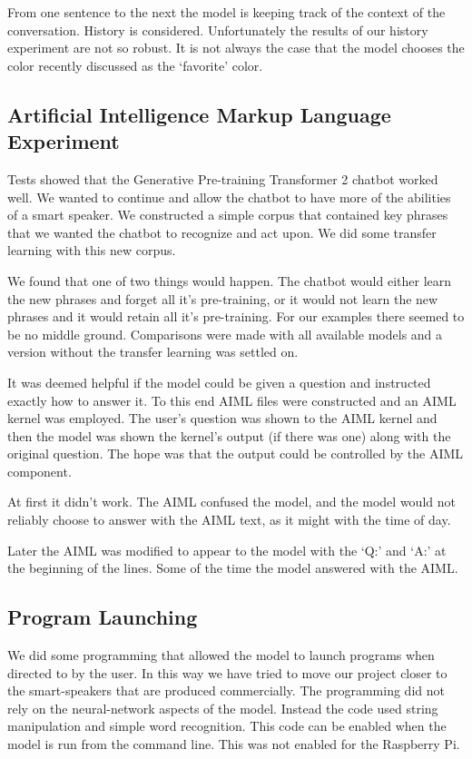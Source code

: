 From one sentence to the next the model is keeping track of the context of the conversation. History is considered. Unfortunately the results of our history experiment are not so robust. It is not always the case that the model chooses the color recently discussed as the `favorite' color.

\subsection{Artificial Intelligence Markup Language Experiment}
Tests showed that the Generative Pre-training Transformer 2 chatbot worked well. We wanted to continue and allow the chatbot to have more of the abilities of a smart speaker. We constructed a simple corpus that contained key phrases that we wanted the chatbot to recognize and act upon. We did some transfer learning with this new corpus.

We found that one of two things would happen. The chatbot would either learn the new phrases and forget all it's pre-training, or it would not learn the new phrases and it would retain all it's pre-training. For our examples there seemed to be no middle ground. Comparisons were made with all available models and a version without the transfer learning was settled on.

It was deemed helpful if the model could be given a question and instructed exactly how to answer it. To this end AIML files were constructed and an AIML kernel was employed. The user's question was shown to the AIML kernel and then the model was shown the kernel's output (if there was one) along with the original question. The hope was that the output could be controlled by the AIML component. 

At first it didn't work. The AIML confused the model, and the model would not reliably choose to answer with the AIML text, as it might with the time of day.

Later the AIML was modified to appear to the model with the `Q:' and `A:' at the beginning of the lines. Some of the time the model answered with the AIML. 

\subsection{Program Launching}

We did some programming that allowed the model to launch programs when directed to by the user. In this way we have tried to move our project closer to the smart-speakers that are produced commercially. The programming did not rely on the neural-network aspects of the model. Instead the code used string manipulation and simple word recognition. This code can be enabled when the model is run from the command line. This was not enabled for the Raspberry Pi.

